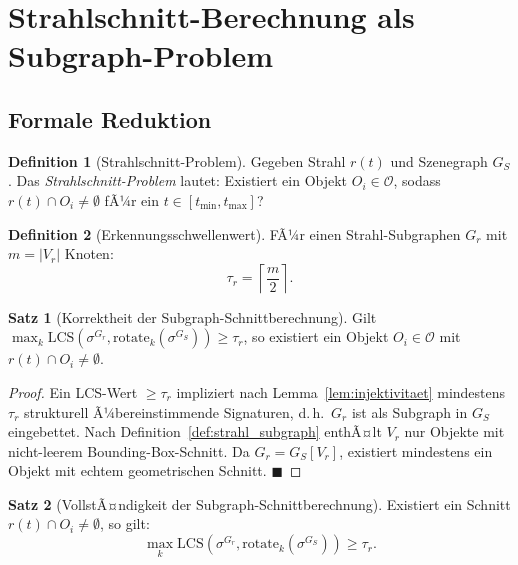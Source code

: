 ﻿\documentclass[a4paper,12pt]{article}
\theoremstyle{definition}
\newtheorem{definition}{Definition}[section]
\newtheorem{satz}{Satz}[section]
\begin{document}
\section{Strahlschnitt-Berechnung als Subgraph-Problem}

\subsection{Formale Reduktion}

\begin{definition}[Strahlschnitt-Problem]
  \label{def:strahlschnitt}
  Gegeben Strahl $r(t)$ und Szenegraph $G_S$.
  Das \emph{Strahlschnitt-Problem} lautet: Existiert ein Objekt
  $O_i \in \mathcal{O}$, sodass $r(t) \cap O_i \neq \emptyset$
  fÃ¼r ein $t \in [t_{\min}, t_{\max}]$?
\end{definition}

\begin{definition}[Erkennungsschwellenwert]
  \label{def:schwellenwert}
  FÃ¼r einen Strahl-Subgraphen $G_r$ mit $m = |V_r|$ Knoten:
  \[
    \tau_r = \left\lceil \frac{m}{2} \right\rceil.
  \]
\end{definition}

\begin{satz}[Korrektheit der Subgraph-Schnittberechnung]
  \label{satz:schnitt_korrektheit}
  Gilt $\max_k \mathrm{LCS}(\sigma^{G_r},
  \mathrm{rotate}_k(\sigma^{G_S})) \geq \tau_r$, so existiert
  ein Objekt $O_i \in \mathcal{O}$ mit $r(t) \cap O_i \neq \emptyset$.
\end{satz}

\begin{proof}
  Ein LCS-Wert $\geq \tau_r$ impliziert nach
  Lemma~\ref{lem:injektivitaet} mindestens $\tau_r$ strukturell
  Ã¼bereinstimmende Signaturen, d.\,h.\ $G_r$ ist als Subgraph in
  $G_S$ eingebettet. Nach Definition~\ref{def:strahl_subgraph}
  enthÃ¤lt $V_r$ nur Objekte mit nicht-leerem Bounding-Box-Schnitt.
  Da $G_r = G_S[V_r]$, existiert mindestens ein Objekt mit
  echtem geometrischen Schnitt. \hfill$\blacksquare$
\end{proof}

\begin{satz}[VollstÃ¤ndigkeit der Subgraph-Schnittberechnung]
  \label{satz:schnitt_vollstaendigkeit}
  Existiert ein Schnitt $r(t) \cap O_i \neq \emptyset$, so gilt:
  \[
    \max_k \mathrm{LCS}\!\left(\sigma^{G_r},
    \mathrm{rotate}_k(\sigma^{G_S})\right) \geq \tau_r.
  \]
\end{satz}
\end{document}
